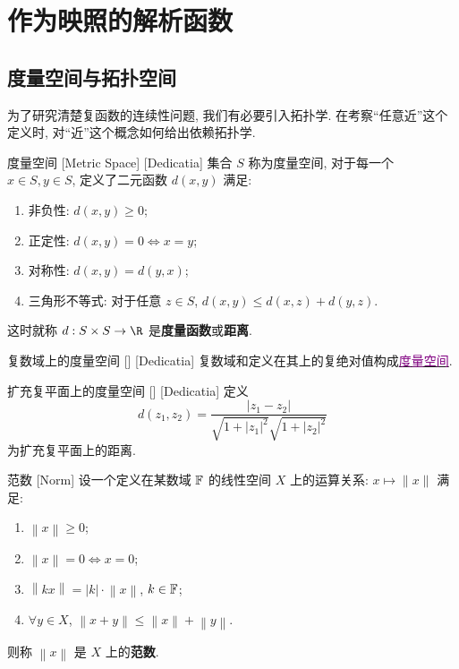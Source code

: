 \documentclass[UTF8]{ctexart}
\newcommand{\hyperrefc}[2]{\hyperref[#1]{\textcolor{purple}{#2}}}
\begin{document}
\section{作为映照的解析函数}
\subsection{度量空间与拓扑空间}
为了研究清楚复函数的连续性问题, 我们有必要引入拓扑学. 在考察“任意近”这个定义时, 对“近”这个概念如何给出依赖拓扑学. 
\begin{dfn}
    [MetricSpace]
    {度量空间}
    [Metric Space]
    [Dedicatia]
    集合 \( S \) 称为度量空间, 对于每一个 \( x\in S, y\in S \), 定义了二元函数 \( d(x,y) \) 满足: 
    \begin{enumerate}
        \item 非负性:  \( d(x,y)\geqslant 0 \);
        \item 正定性:  \( d(x,y)=0\Longleftrightarrow x=y \);
        \item 对称性:  \( d(x,y)=d(y,x) \);
        \item 三角形不等式: 对于任意 \( z\in S \),  \( d(x,y)\leqslant d(x,z)+d(y,z) \).
    \end{enumerate}
    这时就称 \( d:S\times S\to \R \) 是\textbf{度量函数}或\textbf{距离}. 
\end{dfn}
\begin{xmp}
    [UUID]
    {复数域上的度量空间}
    []
    [Dedicatia]
    复数域和定义在其上的复绝对值构成\hyperrefc{dfn:MetricSpace}{度量空间}. 
\end{xmp}
\begin{xmp}
    [UUID]
    {扩充复平面上的度量空间}
    []
    [Dedicatia]
    定义
    \[d(z_1,z_2)=\frac{|z_1-z_2|}{\sqrt{1+|z_1|^2}\sqrt{1+|z_2|^2}}\]
    为扩充复平面上的距离. 
\end{xmp}
\begin{dfn}
    {范数}
    [Norm]
    设一个定义在某数域 \( \operatorname{\mathbb{F}} \) 的线性空间 \( X \) 上的运算关系:  \( x\mapsto\lVert x\rVert \) 满足: 
    \begin{enumerate}
        \item  \( \left\lVert x\right\rVert\geq 0 \);
        \item  \( \left\lVert x\right\rVert=0\Longleftrightarrow x=0 \);
        \item  \( \left\lVert kx\right\rVert=|k|\cdot\left\lVert x\right\rVert  \),  \( k\in\operatorname{\mathbb{F}} \);
        \item  \( \forall y\in X \),  \( \left\lVert x+y\right\rVert\leq\left\lVert x\right\rVert+\left\lVert y\right\rVert    \). 
    \end{enumerate}
    则称 \( \left\lVert x\right\rVert  \) 是 \( X \) 上的\textbf{范数}.
\end{dfn}
\end{document}
